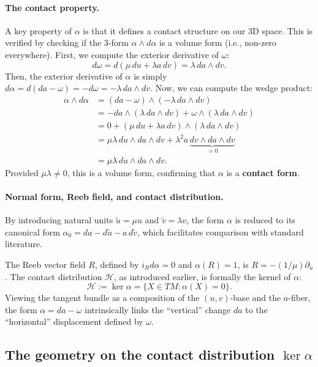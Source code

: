 \paragraph{The contact property.}
A key property of $\alpha$ is that it defines a contact structure on our 3D space. This is verified by checking if the 3-form $\alpha \wedge d\alpha$ is a volume form (i.e., non-zero everywhere). First, we compute the exterior derivative of $\omega$:
\[
d\omega = d(\mu\,du + \lambda a\,dv) = \lambda\,da \wedge dv.
\]
Then, the exterior derivative of $\alpha$ is simply $d\alpha = d(da - \omega) = -d\omega = -\lambda\,da \wedge dv$. Now, we can compute the wedge product:
\begin{align*}
\alpha \wedge d\alpha &= (da - \omega) \wedge (-\lambda\,da \wedge dv) \\
&= -da \wedge (\lambda\,da \wedge dv) + \omega \wedge (\lambda\,da \wedge dv) \\
&= 0 + (\mu\,du + \lambda a\,dv) \wedge (\lambda\,da \wedge dv) \\
&= \mu\lambda\,du \wedge da \wedge dv + \lambda^2 a\,\underbrace{dv \wedge da \wedge dv}_{=0} \\
&= \mu\lambda\,du \wedge da \wedge dv.
\end{align*}
Provided $\mu\lambda \neq 0$, this is a volume form, confirming that $\alpha$ is a \textbf{contact form}.

\paragraph{Normal form, Reeb field, and contact distribution.}
By introducing natural units $\tilde{u} = \mu u$ and $\tilde{v} = \lambda v$, the form $\alpha$ is reduced to its canonical form $\alpha_0 = da - d\tilde{u} - a\,d\tilde{v}$, which facilitates comparison with standard literature.

The Reeb vector field $R$, defined by $i_R d\alpha = 0$ and $\alpha(R) = 1$, is $R = -(1/\mu)\partial_u$. The contact distribution $\mathcal{H}$, as introduced earlier, is formally the kernel of $\alpha$:
\[
\mathcal{H} := \ker\alpha = \{X \in TM : \alpha(X) = 0\}.
\]
Viewing the tangent bundle as a composition of the $(u,v)$-base and the $a$-fiber, the form $\alpha = da - \omega$ intrinsically links the ``vertical'' change $da$ to the ``horizontal'' displacement defined by $\omega$.

\subsection{The geometry on the contact distribution \texorpdfstring{$\ker\alpha$}{ker(alpha)}} %
\label{subsec:geometry_on_ker_alpha}

